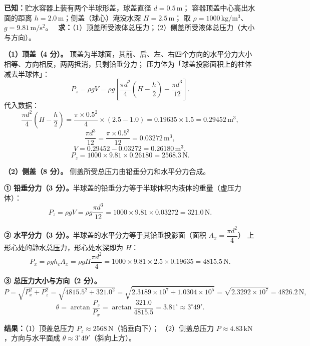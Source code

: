 
\begin{jie}
\textbf{已知：}贮水容器上装有两个半球形盖，球盖直径 $d=0.5\,\mathrm{m}$；
容器顶盖中心高出水面的距离 $h=2.0\,\mathrm{m}$；侧盖（球心）淹没水深 $H=2.5\,\mathrm{m}$；
取 $\rho=1000\,\mathrm{kg/m^{3}}$、$g=9.81\,\mathrm{m/s^{2}}$。
\ \textbf{求：}（1）顶盖所受液体总压力；（2）侧盖所受液体总压力（大小与方向）。

\textbf{（1）顶盖（4 分）。}
顶盖为半球面，其前、后、左、右四个方向的水平分力大小相等、方向相反，两两抵消，只剩铅垂分力；
压力体为「球盖投影面积上的柱体减去半球体」：
\[
P_z=\rho gV=\rho g\left[\frac{\pi d^{2}}{4}\left(H-\frac{h}{2}\right)-\frac{\pi d^{3}}{12}\right].
\]
代入数据：
\[
\frac{\pi d^{2}}{4}\left(H-\frac{h}{2}\right)=\frac{\pi\times0.5^{2}}{4}\times(2.5-1.0)
=0.19635\times1.5=0.29452\,\mathrm{m^{3}},
\]
\[
\frac{\pi d^{3}}{12}=\frac{\pi\times0.5^{3}}{12}=0.03272\,\mathrm{m^{3}},
\]
\[
V=0.29452-0.03272=0.26180\,\mathrm{m^{3}},
\]
\[
P_z=1000\times9.81\times0.26180=2568.3\,\mathrm{N}.
\]

\textbf{（2）侧盖（8 分）。}
侧盖所受总压力由铅垂分力和水平分力合成。

\textbf{① 铅垂分力（3 分）。}半球盖的铅垂分力等于半球体积内液体的重量（虚压力体）：
\[
P_z=\rho gV=\rho g\frac{\pi d^{3}}{12}
=1000\times9.81\times0.03272=321.0\,\mathrm{N}.
\]

\textbf{② 水平分力（3 分）。}半球盖的水平分力等于其铅垂投影面（面积 $A_x=\dfrac{\pi d^{2}}{4}$）
上形心处的静水总压力，形心处水深即为 $H$：
\[
P_x=\rho gh_cA_x=\rho gH\frac{\pi d^{2}}{4}
=1000\times9.81\times2.5\times0.19635=4815.5\,\mathrm{N}.
\]

\textbf{③ 总压力大小与方向（2 分）。}
\[
P=\sqrt{P_x^{2}+P_z^{2}}
=\sqrt{4815.5^{2}+321.0^{2}}
=\sqrt{2.3189\times10^{7}+1.0304\times10^{5}}
=\sqrt{2.3292\times10^{7}}=4826.2\,\mathrm{N},
\]
\[
\theta=\arctan\frac{P_z}{P_x}=\arctan\frac{321.0}{4815.5}=3.81^{\circ}\approx3^{\circ}49' .
\]

\textbf{结果：}（1）顶盖总压力 $P_z\approx2568\,\mathrm{N}$（铅垂向下）；
（2）侧盖总压力 $P\approx4.83\,\mathrm{kN}$，方向与水平面成 $\theta\approx3^{\circ}49'$（斜向上方）。
\end{jie}

